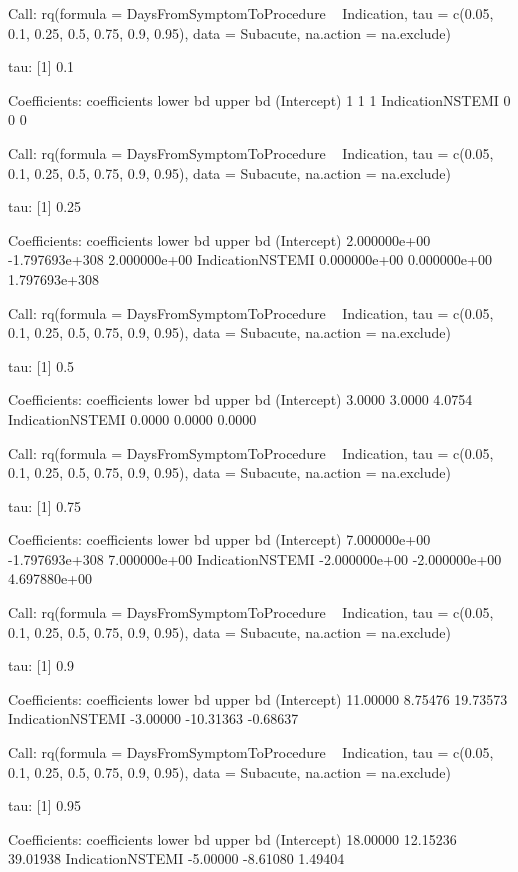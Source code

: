 \documentclass[presentation,xcolor=pdftex,dvipsnames,table,11pt]{beamer}
\begin{document}
\begin{tiny}
\begin{frame}
\begin{Schunk}
\begin{Soutput}
Call: rq(formula = DaysFromSymptomToProcedure ~ Indication, tau = c(0.05, 
    0.1, 0.25, 0.5, 0.75, 0.9, 0.95), data = Subacute, na.action = na.exclude)

tau: [1] 0.1

Coefficients:
                 coefficients lower bd upper bd
(Intercept)      1            1        1       
IndicationNSTEMI 0            0        0       

Call: rq(formula = DaysFromSymptomToProcedure ~ Indication, tau = c(0.05, 
    0.1, 0.25, 0.5, 0.75, 0.9, 0.95), data = Subacute, na.action = na.exclude)

tau: [1] 0.25

Coefficients:
                 coefficients   lower bd       upper bd      
(Intercept)        2.000000e+00 -1.797693e+308   2.000000e+00
IndicationNSTEMI   0.000000e+00   0.000000e+00  1.797693e+308

Call: rq(formula = DaysFromSymptomToProcedure ~ Indication, tau = c(0.05, 
    0.1, 0.25, 0.5, 0.75, 0.9, 0.95), data = Subacute, na.action = na.exclude)

tau: [1] 0.5

Coefficients:
                 coefficients lower bd upper bd
(Intercept)      3.0000       3.0000   4.0754  
IndicationNSTEMI 0.0000       0.0000   0.0000  

Call: rq(formula = DaysFromSymptomToProcedure ~ Indication, tau = c(0.05, 
    0.1, 0.25, 0.5, 0.75, 0.9, 0.95), data = Subacute, na.action = na.exclude)

tau: [1] 0.75

Coefficients:
                 coefficients   lower bd       upper bd      
(Intercept)        7.000000e+00 -1.797693e+308   7.000000e+00
IndicationNSTEMI  -2.000000e+00  -2.000000e+00   4.697880e+00

Call: rq(formula = DaysFromSymptomToProcedure ~ Indication, tau = c(0.05, 
    0.1, 0.25, 0.5, 0.75, 0.9, 0.95), data = Subacute, na.action = na.exclude)

tau: [1] 0.9

Coefficients:
                 coefficients lower bd  upper bd 
(Intercept)       11.00000      8.75476  19.73573
IndicationNSTEMI  -3.00000    -10.31363  -0.68637

Call: rq(formula = DaysFromSymptomToProcedure ~ Indication, tau = c(0.05, 
    0.1, 0.25, 0.5, 0.75, 0.9, 0.95), data = Subacute, na.action = na.exclude)

tau: [1] 0.95

Coefficients:
                 coefficients lower bd upper bd
(Intercept)      18.00000     12.15236 39.01938
IndicationNSTEMI -5.00000     -8.61080  1.49404
\end{Soutput}
\end{Schunk}
\end{frame}





\end{tiny}
\end{document}
